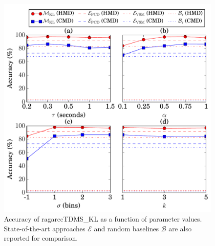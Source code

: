 \begin{figure}[t]
	\begin{center}
		\includegraphics[width=\figSizeEighty]{ch07_ragaRecognition/figures/accuracy_vs_parameters_long2.pdf}
	\end{center}\vspace{-1em}
	\caption{Accuracy of \acrshort{ragarecTDMS_KL} as a function of parameter values. State-of-the-art approaches $\mathcal{E}$ and random baselines $\mathcal{B}$ are also reported for comparison.} 
	\label{fig:accuracy_vs_parameter_values}
\end{figure}

